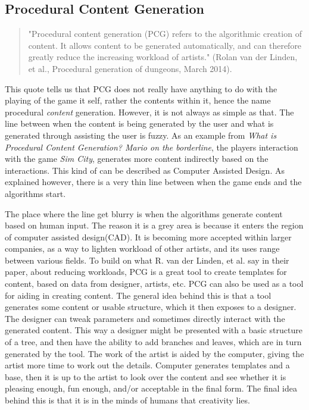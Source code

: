 \subsection{Procedural Content Generation}
\begin{quotation}
"Procedural content generation (PCG) refers to the algorithmic creation of content. It allows content to be generated automatically, and can therefore greatly reduce the increasing workload of artists." (Rolan van der Linden, et al., Procedural generation of dungeons, March 2014).
\end{quotation}
This quote tells us that PCG does not really have anything to do with the playing of the game it self, rather the contents within it, hence the name procedural \textit{content} generation. 
However, it is not always as simple as that. The line between when the content is being generated by the user and what is generated through assisting the user is fuzzy.
As an example from \textit{What is Procedural Content Generation? Mario on the borderline}\cite{art:whatpcg}, the players interaction with the game \textit{Sim City}, generates more content indirectly based on the interactions. This kind of can be described as Computer Assisted Design. As explained however, there is a very thin line between when the game ends and the algorithms start. 

The place where the line get blurry is when the algorithms generate content based on human input. The reason it is a grey area is because it enters the region of computer assisted design(CAD)\cite{book:cad}.
It is becoming more accepted within larger companies, as a way to lighten workload of other artists, and its uses range between various fields.
To build on what R. van der Linden, et al. say in their paper, about reducing workloads, PCG is a great tool to create templates for content, based on data from designer, artists, etc. PCG can also be used as a tool for aiding in creating content.  
The general idea behind this is that a tool generates some content or usable structure, which it then exposes to a designer. The designer can tweak parameters and sometimes directly interact with the generated content. This way a designer might be presented with a basic structure of a tree, and then have the ability to add branches and leaves, which are in turn generated by the tool. 
The work of the artist is aided by the computer, giving the artist more time to work out the details. Computer generates templates and a base, then it is up to the artist to look over the content and see whether it is pleasing enough, fun enough, and/or acceptable in the final form. The final idea behind this is that it is in the minds of humans that creativity lies. 

